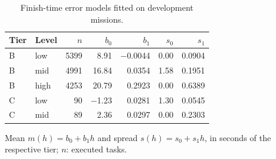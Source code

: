 \begin{table}[t]
\caption{Finish-time error models fitted on development missions.}\label{tab:errmodels}
\centering\small
\begin{threeparttable}
\begin{tabular}{llrrrrr}
\toprule
Tier & Level & $n$ & $b_0$ & $b_1$ & $s_0$ & $s_1$ \\
\midrule
B & low & 5399 & 8.91 & $-$0.0044 & 0.00 & 0.0904 \\
B & mid & 4991 & 16.84 & 0.0354 & 1.58 & 0.1951 \\
B & high & 4253 & 20.79 & 0.2923 & 0.00 & 0.6389 \\
C & low & 90 & $-$1.23 & 0.0281 & 1.30 & 0.0545 \\
C & mid & 89 & 2.36 & 0.0297 & 0.00 & 0.2303 \\
\bottomrule
\end{tabular}
\begin{tablenotes}[flushleft]\scriptsize
\item[] Mean $m(h)=b_0+b_1h$ and spread $s(h)=s_0+s_1h$, in seconds of the respective tier; $n$: executed tasks.
\end{tablenotes}
\end{threeparttable}
\end{table}
